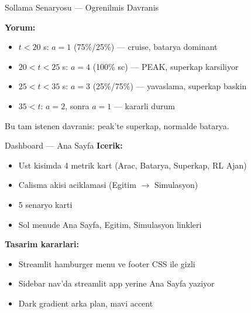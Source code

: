 \documentclass[10pt,aspectratio=169]{beamer}
\begin{document}
\begin{frame}{Sollama Senaryosu --- Ogrenilmis Davranis}
\begin{center}
\end{center}

\textbf{Yorum:}
\begin{itemize}\footnotesize
  \item $t < 20$ s: $a = 1$ (75\%/25\%) --- cruise, batarya dominant
  \item $20 < t < 25$ s: $a = 4$ (100\% sc) --- PEAK, superkap karsiliyor
  \item $25 < t < 35$ s: $a = 3$ (25\%/75\%) --- yavaslama, superkap baskin
  \item $35 < t$: $a = 2$, sonra $a = 1$ --- kararli durum
\end{itemize}

\begin{tcolorbox}[colback=green!8,colframe=green!50!black,boxrule=0.4pt]
Bu tam istenen davranis: peak'te superkap, normalde batarya.
\end{tcolorbox}
\end{frame}

\begin{frame}{Dashboard --- Ana Sayfa}
\textbf{Icerik:}
\begin{itemize}\footnotesize
  \item Ust kisimda 4 metrik kart (Arac, Batarya, Superkap, RL Ajan)
  \item Calisma akisi aciklamasi (Egitim $\to$ Simulasyon)
  \item 5 senaryo karti
  \item Sol menude Ana Sayfa, Egitim, Simulasyon linkleri
\end{itemize}

\textbf{Tasarim kararlari:}
\begin{itemize}\footnotesize
  \item Streamlit hamburger menu ve footer CSS ile gizli
  \item Sidebar nav'da streamlit app yerine Ana Sayfa yaziyor
  \item Dark gradient arka plan, mavi accent
\end{itemize}
\end{frame}
\end{document}
